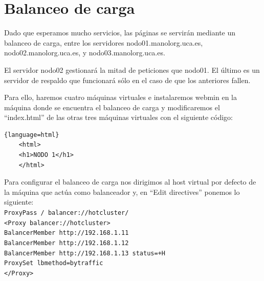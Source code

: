 \documentclass[12pt,letterpaper]{article}
\begin{document}
\section{Balanceo de carga}
Dado que esperamos mucho servicios, las páginas se servirán mediante un balanceo de carga, entre los servidores nodo01.manolorg.uca.es, nodo02.manolorg.uca.es, y nodo03.manolorg.uca.es.

El servidor nodo02 gestionará la mitad de peticiones que nodo01. El último es un servidor de respaldo que funcionará sólo en el caso de que los anteriores fallen.

Para ello, haremos cuatro máquinas virtuales e instalaremos webmin en la máquina donde se encuentra el balanceo de carga y modificaremos el ``index.html'' de las otras tres máquinas virtuales con el siguiente código:
\begin{lstlisting}{language=html}
	<html>
	<h1>NODO 1</h1>
	</html>
\end{lstlisting}

Para configurar el balanceo de carga nos dirigimos al host virtual por defecto de la máquina que actúa como balanceador y, en ``Edit directives'' ponemos lo siguiente:\\

\noindent
	\texttt{ProxyPass / balancer://hotcluster/\\
		<Proxy balancer://hotcluster>\\
		BalancerMember http://192.168.1.11\\
		BalancerMember http://192.168.1.12\\
		BalancerMember http://192.168.1.13 status=+H\\
		ProxySet lbmethod=bytraffic\\
		</Proxy>}\\
\end{document}

